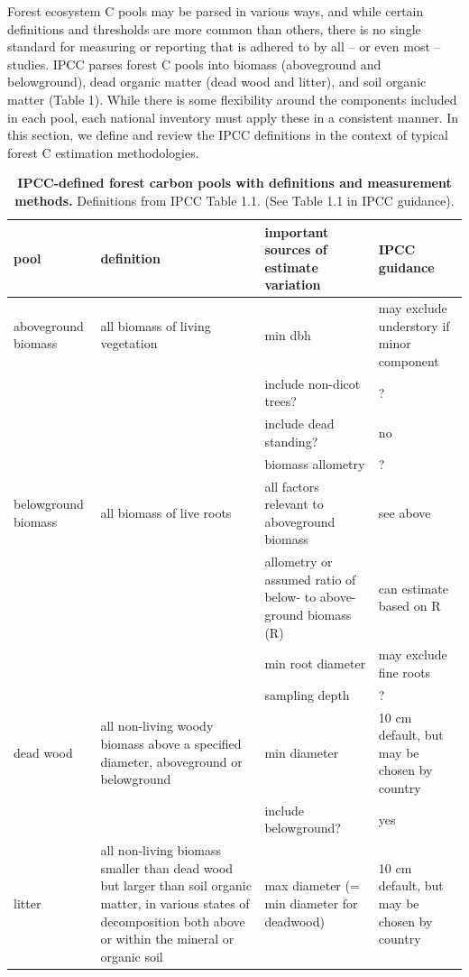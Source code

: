 \documentclass[, manuscript]{copernicus}
\begin{document}
Forest ecosystem C pools may be parsed in various ways, and while
certain definitions and thresholds are more common than others, there is
no single standard for measuring or reporting that is adhered to by all
-- or even most -- studies. IPCC parses forest C pools into biomass
(aboveground and belowground), dead organic matter (dead wood and
litter), and soil organic matter (Table 1). While there is some
flexibility around the components included in each pool, each national
inventory must apply these in a consistent manner. In this section, we
define and review the IPCC definitions in the context of typical forest
C estimation methodologies.

\begin{table}

\caption{\label{tab:table_pools}\textbf{IPCC-defined forest carbon pools with definitions and measurement methods.} Definitions from IPCC Table 1.1. (See Table 1.1 in IPCC guidance).}
\centering
\begin{tabu} to 
\hline
\textbf{pool} & \textbf{definition} & \textbf{important sources of estimate variation} & \textbf{IPCC guidance}\\
\hline
aboveground biomass & all biomass of living vegetation & min dbh & may exclude understory if minor component\\
\hline
 &  & include non-dicot trees? & ?\\
\hline
 &  & include dead standing? & no\\
\hline
 &  & biomass allometry & ?\\
\hline
belowground biomass & all biomass of live roots & all factors relevant to aboveground biomass & see above\\
\hline
 &  & allometry or assumed ratio of below- to above-ground biomass (R) & can estimate based on R\\
\hline
 &  & min root diameter & may exclude fine roots\\
\hline
 &  & sampling depth & ?\\
\hline
dead wood & all non-living woody biomass above a specified diameter, aboveground or belowground & min diameter & 10 cm default, but may be chosen by country\\
\hline
 &  & include belowground? & \vphantom{1} yes\\
\hline
litter & all non-living biomass smaller than dead wood but larger than soil organic matter, in various states of decomposition both above or within the mineral or organic soil & max diameter (= min diameter for deadwood) & 10 cm default, but may be chosen by country\\

\end{tabu}
\end{table}
\end{document}
